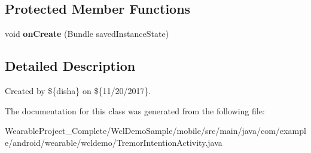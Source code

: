 \subsection*{Protected Member Functions}
\begin{DoxyCompactItemize}
\item 
void {\bfseries on\+Create} (Bundle saved\+Instance\+State)\hypertarget{classcom_1_1example_1_1android_1_1wearable_1_1wcldemo_1_1TremorIntentionActivity_ae879abe4a6b7f8b932bae6b2f24f248b}{}\label{classcom_1_1example_1_1android_1_1wearable_1_1wcldemo_1_1TremorIntentionActivity_ae879abe4a6b7f8b932bae6b2f24f248b}

\end{DoxyCompactItemize}


\subsection{Detailed Description}
Created by \$\{disha\} on \$\{11/20/2017\}. 

The documentation for this class was generated from the following file\+:\begin{DoxyCompactItemize}
\item 
Wearable\+Project\+\_\+\+Complete/\+Wcl\+Demo\+Sample/mobile/src/main/java/com/example/android/wearable/wcldemo/Tremor\+Intention\+Activity.\+java\end{DoxyCompactItemize}
